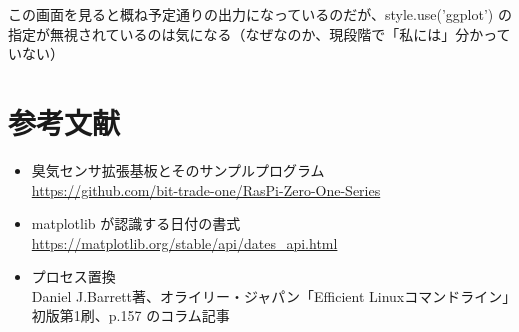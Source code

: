 \documentclass[12pt,a4paper,uplatex]{jsarticle}
\begin{document}
この画面を見ると概ね予定通りの出力になっているのだが、style.use('ggplot') の指定が無視されているのは気になる（なぜなのか、現段階で「私には」分かっていない）

\newpage

\section{参考文献}

\begin{itemize}
	\item 臭気センサ拡張基板とそのサンプルプログラム\\
	\url{https://github.com/bit-trade-one/RasPi-Zero-One-Series}
	\item matplotlib が認識する日付の書式\\
	\url{https://matplotlib.org/stable/api/dates_api.html}
	\item プロセス置換\\
	Daniel J.Barrett著、オライリー・ジャパン「Efficient Linuxコマンドライン」初版第1刷、p.157 のコラム記事
\end{itemize}
\end{document}
